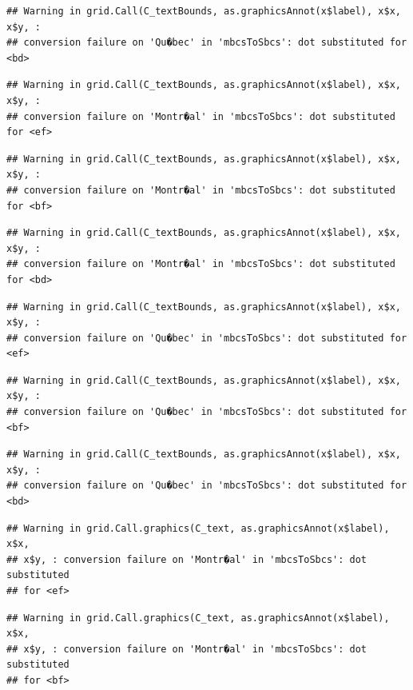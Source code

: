 \documentclass[]{article}
\begin{document}
\begin{verbatim}
## Warning in grid.Call(C_textBounds, as.graphicsAnnot(x$label), x$x, x$y, :
## conversion failure on 'Qu�bec' in 'mbcsToSbcs': dot substituted for <bd>
\end{verbatim}

\begin{verbatim}
## Warning in grid.Call(C_textBounds, as.graphicsAnnot(x$label), x$x, x$y, :
## conversion failure on 'Montr�al' in 'mbcsToSbcs': dot substituted for <ef>
\end{verbatim}

\begin{verbatim}
## Warning in grid.Call(C_textBounds, as.graphicsAnnot(x$label), x$x, x$y, :
## conversion failure on 'Montr�al' in 'mbcsToSbcs': dot substituted for <bf>
\end{verbatim}

\begin{verbatim}
## Warning in grid.Call(C_textBounds, as.graphicsAnnot(x$label), x$x, x$y, :
## conversion failure on 'Montr�al' in 'mbcsToSbcs': dot substituted for <bd>
\end{verbatim}

\begin{verbatim}
## Warning in grid.Call(C_textBounds, as.graphicsAnnot(x$label), x$x, x$y, :
## conversion failure on 'Qu�bec' in 'mbcsToSbcs': dot substituted for <ef>
\end{verbatim}

\begin{verbatim}
## Warning in grid.Call(C_textBounds, as.graphicsAnnot(x$label), x$x, x$y, :
## conversion failure on 'Qu�bec' in 'mbcsToSbcs': dot substituted for <bf>
\end{verbatim}

\begin{verbatim}
## Warning in grid.Call(C_textBounds, as.graphicsAnnot(x$label), x$x, x$y, :
## conversion failure on 'Qu�bec' in 'mbcsToSbcs': dot substituted for <bd>
\end{verbatim}

\begin{verbatim}
## Warning in grid.Call.graphics(C_text, as.graphicsAnnot(x$label), x$x,
## x$y, : conversion failure on 'Montr�al' in 'mbcsToSbcs': dot substituted
## for <ef>
\end{verbatim}

\begin{verbatim}
## Warning in grid.Call.graphics(C_text, as.graphicsAnnot(x$label), x$x,
## x$y, : conversion failure on 'Montr�al' in 'mbcsToSbcs': dot substituted
## for <bf>
\end{verbatim}
\end{document}
